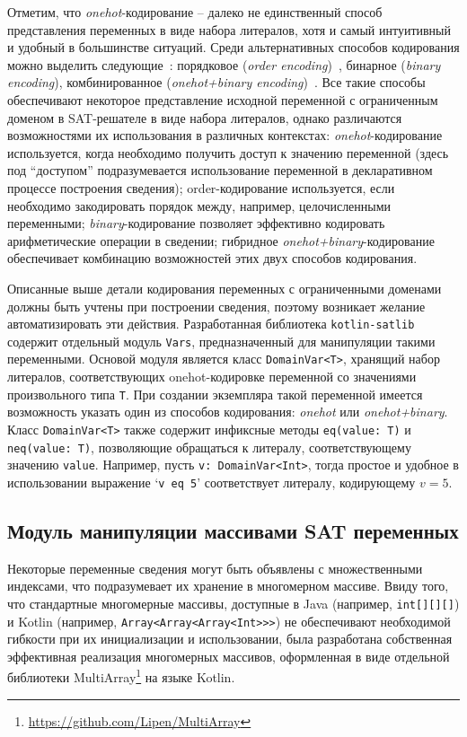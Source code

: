 Отметим, что \textit{onehot}-кодирование \--- далеко не единственный способ представления переменных в виде набора литералов, хотя и самый интуитивный и удобный в большинстве ситуаций.
Среди альтернативных способов кодирования можно выделить следующие~\cite{sat-encodings}: порядковое (\textit{order encoding})~\cite{order-encoding}, бинарное (\textit{binary encoding}), комбинированное (\textit{onehot+binary encoding})~\cite{sat-encodings}.
Все такие способы обеспечивают некоторое представление исходной переменной с ограниченным доменом в SAT-решателе в виде набора литералов, однако различаются возможностями их использования в различных контекстах: \textit{onehot}-кодирование используется, когда необходимо получить доступ к значению переменной (здесь под \enquote{доступом} подразумевается использование переменной в декларативном процессе построения сведения); order-кодирование используется, если необходимо закодировать порядок между, например, целочисленными переменными; \textit{binary}-кодирование позволяет эффективно кодировать арифметические операции в сведении; гибридное \textit{onehot+binary}-кодирование обеспечивает комбинацию возможностей этих двух способов кодирования.

Описанные выше детали кодирования переменных с ограниченными доменами должны быть учтены при построении сведения, поэтому возникает желание автоматизировать эти действия.
Разработанная библиотека \texttt{kotlin-satlib} содержит отдельный модуль \texttt{Vars}, предназначенный для манипуляции такими переменными.
Основой модуля является класс \texttt{DomainVar<T>}, хранящий набор литералов, соответствующих onehot-кодировке переменной со значениями произвольного типа \texttt{T}.
При создании экземпляра такой переменной имеется возможность указать один из способов кодирования: \textit{onehot} или \textit{onehot+binary}.
Класс \texttt{DomainVar<T>} также содержит инфиксные методы \texttt{eq(value:~T)} и \texttt{neq(value:~T)}, позволяющие обращаться к литералу, соответствующему значению \texttt{value}.
Например, пусть \texttt{v:~DomainVar<Int>}, тогда простое и удобное в использовании выражение `\texttt{v~eq~5}' соответствует литералу, кодирующему $v = 5$.

\subsection{Модуль манипуляции массивами SAT переменных}

Некоторые переменные сведения могут быть объявлены с множественными индексами, что подразумевает их хранение в многомерном массиве.
Ввиду того, что стандартные многомерные массивы, доступные в Java (например, \texttt{int[][][]}) и Kotlin (например, \texttt{Array<\-Array<\-Array<Int>>>}) не обеспечивают необходимой гибкости при их инициализации и использовании, была разработана собственная эффективная реализация многомерных массивов, оформленная в виде отдельной библиотеки MultiArray\footnote{\url{https://github.com/Lipen/MultiArray}} на языке Kotlin.

